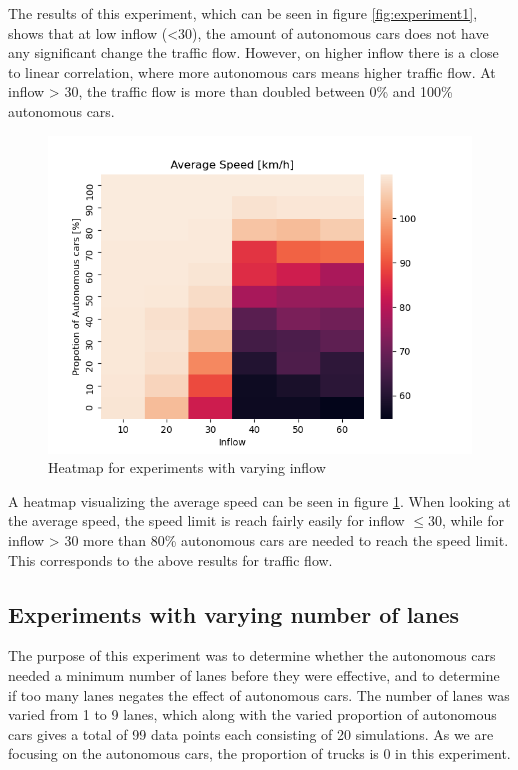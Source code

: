 The results of this experiment, which can be seen in figure \ref{fig:experiment1},  shows that at low inflow (<30), the amount of autonomous cars does not have any significant change the traffic flow. However, on higher inflow there is a close to linear correlation, where more autonomous cars means higher traffic flow. At inflow > 30, the traffic flow is more than doubled between 0\% and 100\% autonomous cars. 
\begin{figure}[H]
    \centering
    \includegraphics[width=\linewidth]{images/Experiment1-Speed.png}
    \caption{Heatmap for experiments with varying inflow}
    \label{fig:experiment1heatmap}
\end{figure}
A heatmap visualizing the average speed can be seen in figure \ref{fig:experiment1heatmap}. When looking at the average speed, the speed limit is reach fairly easily for inflow $\leq 30$, while for inflow > 30 more than 80\% autonomous cars are needed to reach the speed limit. This corresponds to the above results for traffic flow.

\subsection{Experiments with varying number of lanes}
The purpose of this experiment was to determine whether the autonomous cars needed a minimum number of lanes before they were effective, and to determine if too many lanes negates the effect of autonomous cars. The number of lanes was varied from 1 to 9 lanes, which along with the varied proportion of autonomous cars gives a total of 99 data points each consisting of 20 simulations. As we are focusing on the autonomous cars, the proportion of trucks is 0 in this experiment. 

